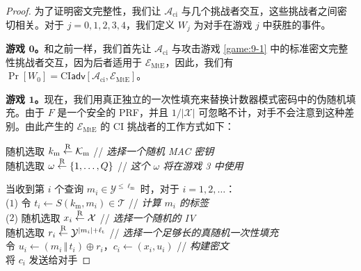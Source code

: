 \begin{proof}
为了证明密文完整性，我们让 $\mathcal{A}_\mathrm{ci}$ 与几个挑战者交互，这些挑战者之间密切相关。对于 $j=0,1,2,3,4$，我们定义 $W_j$ 为对手在游戏 $j$ 中获胜的事件。

\vspace*{5pt}
\noindent\textbf{游戏 $\mathbf{0}$。}和之前一样，我们首先让 $\mathcal{A}_\mathrm{ci}$ 与攻击游戏 \ref{game:9-1} 中的标准密文完整性挑战者交互，因为后者适用于 $\mathcal{E}_\mathrm{MtE}$，因此，我们有 $\Pr[W_0]= \mathrm{CI}\mathsf{adv}[\mathcal{A}_\mathrm{ci},\mathcal{E}_\mathrm{MtE}]$。

\vspace*{5pt}
\noindent\textbf{游戏 $\mathbf{1}$。}现在，我们用真正独立的一次性填充来替换计数器模式密码中的伪随机填充。由于 $F$ 是一个安全的 PRF，并且 $1/|\mathcal{X}|$ 可忽略不计，对手不会注意到这种差别。由此产生的 $\mathcal{E}_\mathrm{MtE}$ 的 CI 挑战者的工作方式如下：

\vspace*{10pt}

\hspace*{5pt} 随机选取 $k_\mathrm{m}\overset{\rm R}\leftarrow\mathcal{K}_\mathrm{m}$
\hspace*{141.5pt} // \quad \emph{选择一个随机 MAC 密钥}\\
\hspace*{26pt} 随机选取 $\omega\overset{\rm R}\leftarrow\{1,\dots,Q\}$
\hspace*{114.5pt} // \quad \emph{这个 $\omega$ 将在游戏 3 中使用}

\vspace*{5pt}

\hspace*{5pt} 当收到第 $i$ 个查询 $m_i\in\mathcal{Y}^{\leq\ell_\mathrm{m}}$ 时，对于 $i=1,2,\dots$：\\
\hspace*{7pt} ($1$)
\hspace*{22.5pt} 令 $t_i\leftarrow S(k_\mathrm{m},m_i)\in\mathcal{T}$
\hspace*{103pt} // \quad \emph{计算 $m_i$ 的标签}\\
\hspace*{7pt} ($2$) 
\hspace*{22.5pt} 随机选取 $x_i\overset{\rm R}\leftarrow\mathcal{X}$
\hspace*{126pt} // \quad \emph{选择一个随机的 IV}\\
\hspace*{47pt} \colorbox{gray!50}{随机选取 $r_i\overset{\rm R}\leftarrow\mathcal{Y}^{|m_i|+\ell_\mathrm{t}}$}
\hspace*{97pt} // \quad \emph{选择一个足够长的真随机一次性填充}\\
\hspace*{50pt} 令 $u_i\leftarrow (m_i\,\Vert\,t_i)\oplus r_i$，$c_i\leftarrow(x_i,u_i)$
\hspace*{42.5pt} // \quad \emph{构建密文}\\
\hspace*{50pt} 将 $c_i$ 发送给对手


\end{proof}

